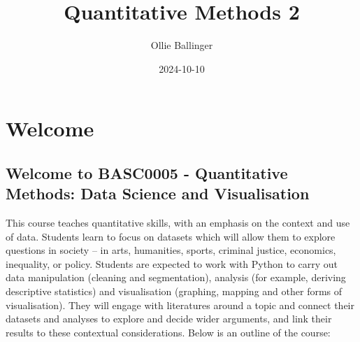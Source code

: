 \documentclass[
  letterpaper,
  DIV=11,
  numbers=noendperiod]{scrreprt}
\title{Quantitative Methods 2}
\author{Ollie Ballinger}
\date{2024-10-10}
\renewcommand*\contentsname{Table of contents}
\newcommand\contentsname{Table of contents}
\begin{document}
\maketitle
\ifdefined\Shaded\renewenvironment{Shaded}{\begin{tcolorbox}[sharp corners, interior hidden, borderline west={3pt}{0pt}{shadecolor}, frame hidden, breakable, enhanced, boxrule=0pt]}{\end{tcolorbox}}\fi

\renewcommand*\contentsname{Table of contents}
{
\hypersetup{linkcolor=}
\setcounter{tocdepth}{2}
\tableofcontents
}

\hypertarget{welcome}{%
\chapter*{Welcome}\label{welcome}}


\hypertarget{welcome-to-basc0005---quantitative-methods-data-science-and-visualisation}{%
\section*{Welcome to BASC0005 - Quantitative Methods: Data Science and
Visualisation}\label{welcome-to-basc0005---quantitative-methods-data-science-and-visualisation}}


This course teaches quantitative skills, with an emphasis on the context
and use of data. Students learn to focus on datasets which will allow
them to explore questions in society -- in arts, humanities, sports,
criminal justice, economics, inequality, or policy. Students are
expected to work with Python to carry out data manipulation (cleaning
and segmentation), analysis (for example, deriving descriptive
statistics) and visualisation (graphing, mapping and other forms of
visualisation). They will engage with literatures around a topic and
connect their datasets and analyses to explore and decide wider
arguments, and link their results to these contextual considerations.
Below is an outline of the course:
\end{document}
